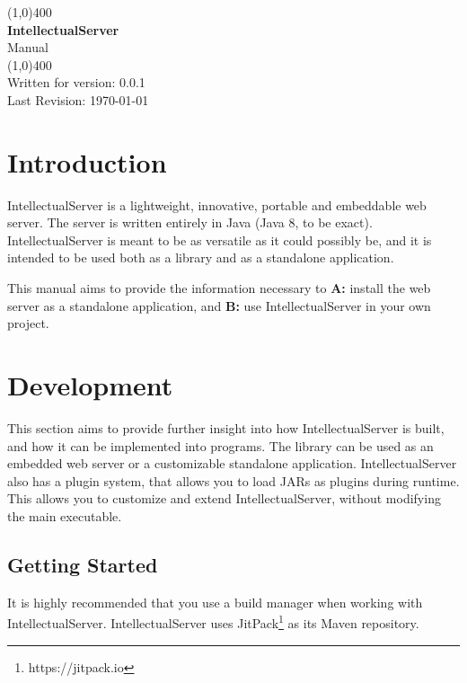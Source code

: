 \documentclass[12pt]{article}
\newcommand{\version}{0.0.1}
\begin{document}
\begin{titlepage}
\linespread{1}
\begin{center}
	\vspace*{1cm}
	\line(1,0){400}\\
	\vspace*{0.5cm}
	\Large\textbf{IntellectualServer} \\
	\Large{Manual} \\
	\line(1,0){400}\\
	\vfill
	Written for version: \version \\
	Last Revision: \today
	\vfill
\end{center}
\end{titlepage}
\clearpage

\tableofcontents
\clearpage

\section{Introduction}\label{sec:introduction}
IntellectualServer is a lightweight, innovative, portable and embeddable web server.
The server is written entirely in Java (Java 8, to be exact).
IntellectualServer is meant to be as versatile as it could possibly be, and it is intended to be used both as a library and as a standalone application.

This manual aims to provide the information necessary to \textbf{A:} install the web server as a standalone application, and \textbf{B:} use IntellectualServer in your own project.

\newpage

\section{Development}\label{sec:development}
This section aims to provide further insight into how IntellectualServer is built, and how it can be implemented into programs.
The library can be used as an embedded web server or a customizable standalone application.
IntellectualServer also has a plugin system, that allows you to load JARs as plugins during runtime.
This allows you to customize and extend IntellectualServer, without modifying the main executable.

\subsection{Getting Started}\label{subsec:gettingStarted}
It is highly recommended that you use a build manager when working with IntellectualServer.
IntellectualServer uses JitPack\footnote{https://jitpack.io} as its Maven repository.
\end{document}
